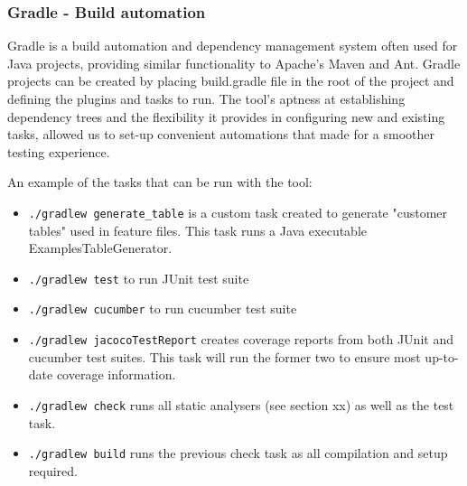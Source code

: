\subsubsection{Gradle - Build automation}
Gradle is a build automation and dependency management system often used for Java projects, providing similar functionality to Apache’s Maven and Ant. 
Gradle projects can be created by placing build.gradle file in the root of the project and defining the plugins and tasks to run. 
The tool's aptness at establishing dependency trees and the flexibility it provides in configuring new and existing tasks, allowed us to set-up convenient automations that made for a smoother testing experience. 
\par
An example of the tasks that can be run with the tool: 
\begin{itemize}
    \item \lstinline{./gradlew generate_table} is a custom task created to generate "customer tables" used in feature files. This task runs a Java executable ExamplesTableGenerator.
    \item \lstinline{./gradlew test} to run JUnit test suite 
    \item \lstinline{./gradlew cucumber} to run cucumber test suite 
    \item \lstinline{./gradlew jacocoTestReport} creates coverage reports from both JUnit and cucumber test suites. This task will run the former two to ensure most up-to-date coverage information. 
    \item \lstinline{./gradlew check} runs all static analysers (see section xx) as well as the test task. 
    \item \lstinline{./gradlew build} runs the previous check task as all compilation and setup required.  
\end{itemize}
